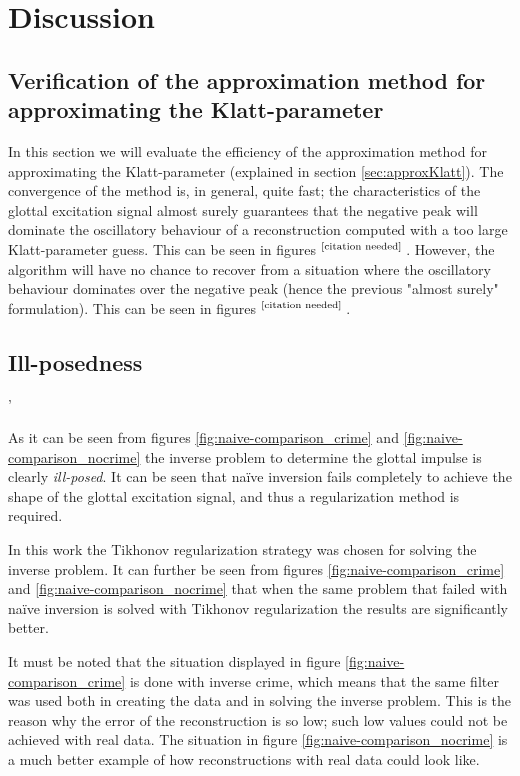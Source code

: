 \documentclass[12pt,a4]{article}
\newcommand{\citeneeded}{\ensuremath{\vphantom{1}^{\text{[citation needed]}}\,}}
\begin{document}
\section{Discussion}
\label{sec:discussion}

\subsection{Verification of the approximation method for \\approximating the Klatt-parameter}

In this section we will evaluate the efficiency of the approximation method for approximating the Klatt-parameter (explained in section \ref{sec:approxKlatt}). The convergence of the method is, in general, quite fast; the characteristics of the glottal excitation signal almost surely guarantees that the negative peak will dominate the oscillatory behaviour of a reconstruction computed with a too large Klatt-parameter guess.
This can be seen in figures \citeneeded. However, the algorithm will have no chance to recover from a situation where the oscillatory behaviour dominates over the negative peak (hence the previous "almost surely" formulation). This can be seen in figures \citeneeded. 

\subsection{Ill-posedness}'

As it can be seen from figures \ref{fig:naive-comparison_crime} and \ref{fig:naive-comparison_nocrime} the inverse problem to determine the glottal impulse is clearly \emph{ill-posed}. It can be seen that naïve inversion fails completely to achieve the shape of the glottal excitation signal, and thus a regularization method is required.

In this work the Tikhonov regularization strategy was chosen for solving the inverse problem. It can further be seen from figures \ref{fig:naive-comparison_crime} and \ref{fig:naive-comparison_nocrime} that when the same problem that failed with naïve inversion is solved with Tikhonov regularization the results are significantly better.

It must be noted that the situation displayed in figure \ref{fig:naive-comparison_crime} is done with inverse crime, which means that the same filter was used both in creating the data and in solving the inverse problem. This is the reason why the error of the reconstruction is so low; such low values could not be achieved with real data. The situation in figure \ref{fig:naive-comparison_nocrime} is a much better example of how reconstructions with real data could look like.
\end{document}
